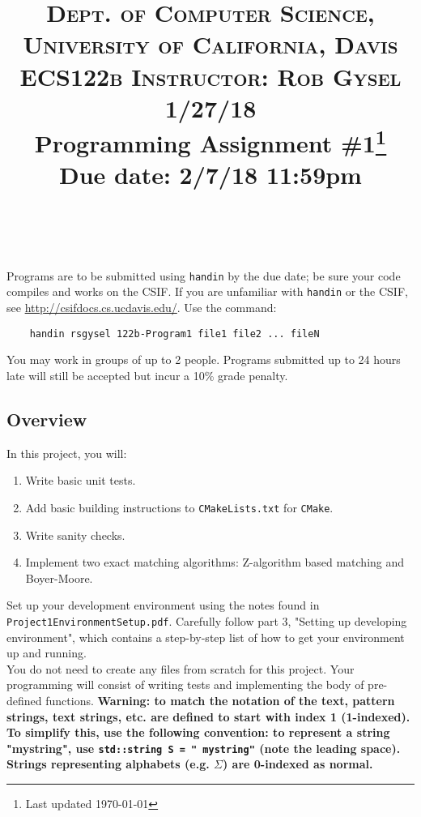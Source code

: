 \documentclass[paper=a4, fontsize=11pt]{scrartcl} %
\title{	
\normalfont \normalsize 
\textsc{Dept. of Computer Science, University of California, Davis\\ECS122b \hspace{.5in} Instructor: Rob Gysel \hspace{.5in} 1/27/18} %
\horrule{0.5pt} \\[0.4cm] %
\huge Programming Assignment \#1\footnote{Last updated \today}\\Due date: 2/7/18 11:59pm \\ %
\horrule{2pt} \\[0.5cm] %
}
\author{} %
\date{}
\numberwithin{equation}{section} %
\numberwithin{figure}{section} %
\numberwithin{table}{section} %
\begin{document}
\maketitle %
\vspace{-3cm}

Programs are to be submitted using \texttt{handin} by the due date; be sure your code compiles and works on the CSIF. If you are unfamiliar with \texttt{handin} or the CSIF, see \url{http://csifdocs.cs.ucdavis.edu/}. Use the command:

\begin{verbatim}
	handin rsgysel 122b-Program1 file1 file2 ... fileN
\end{verbatim}

You may work in groups of up to 2 people.
Programs submitted up to 24 hours late will still be accepted but incur a 10\% grade penalty.

\subsection*{Overview}
In this project, you will:
\begin{enumerate}
	\item Write basic unit tests.
	\item Add basic building instructions to \texttt{CMakeLists.txt} for \texttt{CMake}.
	\item Write sanity checks.
	\item Implement two exact matching algorithms: Z-algorithm based matching and Boyer-Moore.
\end{enumerate}

Set up your development environment using the notes found in \texttt{Project1EnvironmentSetup.pdf}.
Carefully follow part 3, "Setting up developing environment", which contains a step-by-step list of how to get your environment up and running.\\

You do not need to create any files from scratch for this project.
Your programming will consist of writing tests and implementing the body of pre-defined functions.
\textbf{Warning: to match the notation of the text, pattern strings, text strings, etc. are defined to start with index 1 (1-indexed).
To simplify this, use the following convention: to represent a string "mystring", use \texttt{std::string S = " mystring"} (note the leading space).
Strings representing alphabets (e.g. $\Sigma$) are 0-indexed as normal.}
\end{document}
